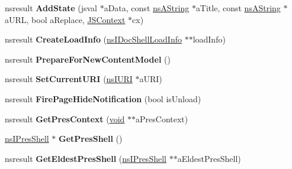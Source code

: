 \begin{DoxyCompactItemize}
\item 
\mbox{\label{interfacens_i_doc_shell_a6b1efbc673011c39e368148a1896ec17}} 
nsresult {\bfseries Add\+State} (jsval $\ast$a\+Data, const \hyperlink{structns_string_container}{ns\+A\+String} $\ast$a\+Title, const \hyperlink{structns_string_container}{ns\+A\+String} $\ast$a\+U\+RL, bool a\+Replace, \hyperlink{interfacevoid}{J\+S\+Context} $\ast$cx)
\item 
\mbox{\label{interfacens_i_doc_shell_a1826af46f28ae4a3bb280757c93496e5}} 
nsresult {\bfseries Create\+Load\+Info} (\hyperlink{interfacens_i_doc_shell_load_info}{ns\+I\+Doc\+Shell\+Load\+Info} $\ast$$\ast$load\+Info)
\item 
\mbox{\label{interfacens_i_doc_shell_a84f523219564e4acf77e9e7d26e6397e}} 
nsresult {\bfseries Prepare\+For\+New\+Content\+Model} ()
\item 
\mbox{\label{interfacens_i_doc_shell_a7da7bb183af6c7637f44e0806d3aeb55}} 
nsresult {\bfseries Set\+Current\+U\+RI} (\hyperlink{interfacens_i_u_r_i}{ns\+I\+U\+RI} $\ast$a\+U\+RI)
\item 
\mbox{\label{interfacens_i_doc_shell_a7ba1f12166d3f76217143450aa15f2b6}} 
nsresult {\bfseries Fire\+Page\+Hide\+Notification} (bool is\+Unload)
\item 
\mbox{\label{interfacens_i_doc_shell_aa8918c6b8a220ccb4a75649d83945aae}} 
nsresult {\bfseries Get\+Pres\+Context} (\hyperlink{interfacevoid}{void} $\ast$$\ast$a\+Pres\+Context)
\item 
\mbox{\label{interfacens_i_doc_shell_a6210aac89b1c8480f485fd3befb377a3}} 
\hyperlink{interfacens_i_supports}{ns\+I\+Pres\+Shell} $\ast$ {\bfseries Get\+Pres\+Shell} ()
\item 
\mbox{\label{interfacens_i_doc_shell_a7c7e6fc0d29142872b9b427b998ad5f8}} 
nsresult {\bfseries Get\+Eldest\+Pres\+Shell} (\hyperlink{interfacens_i_supports}{ns\+I\+Pres\+Shell} $\ast$$\ast$a\+Eldest\+Pres\+Shell)
\item 
\mbox{\label{interfacens_i_doc_shell_a66033d2591032464cf5a83554fc030ad}} 
$$
\end{DoxyCompactItemize}
